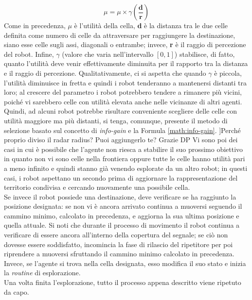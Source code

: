 \begin{equation}
	\label{math:utility-red}
	\mu = \mu\times\gamma\left(\frac{\textbf{d}}{\textbf{r}}\right)
\end{equation}
Come in precedenza, $\mu$ è l'utilità della cella, \textbf{d} è la distanza tra le due celle definita come numero di celle da attraversare per raggiungere la destinazione, siano esse celle sugli assi, diagonali o entrambe; invece, \textbf{r} è il raggio di percezione del robot.
Infine, $\gamma$ (valore che varia nell'intervallo $\left[0, 1\right]$) stabilisce, di fatto, quanto l'utilità deve venir effettivamente diminuita per il rapporto tra la distanza e il raggio di percezione. 
Qualitativamente, ci si aspetta che quando $\gamma$ è piccola, l'utilità diminuisce in fretta e quindi i robot tenderanno a mantenersi distanti tra loro; al crescere del parametro i robot potrebbero tendere a rimanere più vicini, poiché vi sarebbero celle con utilità elevata anche nelle vicinanze di altri agenti.
Quindi, ad alcuni robot potrebbe risultare conveniente scegliere delle celle con utilità maggiore ma più distanti, si tenga, comunque, presente il metodo di selezione basato sul concetto di \textit{info-gain} e la Formula \ref{math:info-gain}.
\todo[inline]]{Perché proprio diviso il radar radius? Puoi aggiungerlo te? Grazie DP}
Vi sono poi dei casi in cui è possibile che l'agente non riesca a stabilire il suo prossimo obiettivo in quanto non vi sono celle nella frontiera oppure tutte le celle hanno utilità pari a meno infinito e quindi stanno già venendo esplorate da un altro robot; in questi casi, i robot aspettano un secondo prima di aggiornare la rappresentazione del territorio condivisa e cercando nuovamente una possibile cella.\\
Se invece il robot possiede una destinazione, deve verificare se ha raggiunto la posizione designata: se non vi è ancora arrivato continua a muoversi seguendo il cammino minimo, calcolato in precedenza, e aggiorna la sua ultima posizione e quella attuale.
Si noti che durante il processo di movimento il robot continua a verificare di essere ancora all'interno della copertura del segnale; se ciò non dovesse essere soddisfatto, incomincia la fase di rilascio del ripetitore per poi riprendere a muoversi sfruttando il cammino minimo calcolato in precedenza.
Invece, se l'agente si trova nella cella designata, esso modifica il suo stato e inizia la \textit{routine} di esplorazione.\\
Una volta finita l'esplorazione, tutto il processo appena descritto viene ripetuto da capo.

